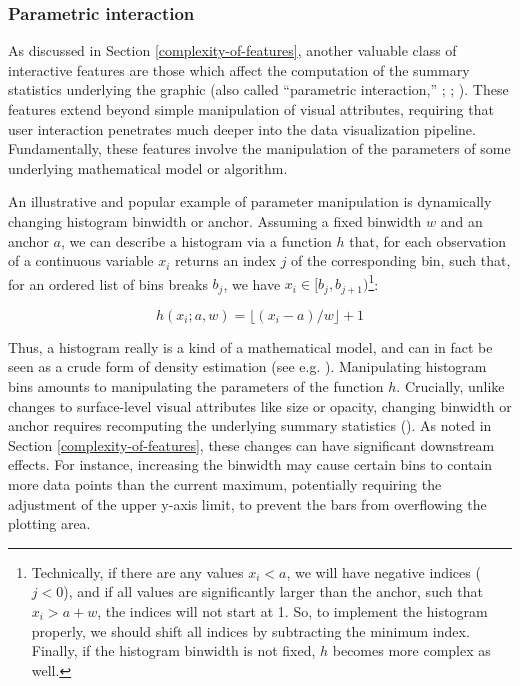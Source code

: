 \documentclass[
]{book}
\begin{document}
\subsubsection{Parametric interaction}\label{parametric-interaction}

As discussed in Section \ref{complexity-of-features}, another valuable class of interactive features are those which affect the computation of the summary statistics underlying the graphic (also called ``parametric interaction,'' ; ; ). These features extend beyond simple manipulation of visual attributes, requiring that user interaction penetrates much deeper into the data visualization pipeline. Fundamentally, these features involve the manipulation of the parameters of some underlying mathematical model or algorithm.

An illustrative and popular example of parameter manipulation is dynamically changing histogram binwidth or anchor. Assuming a fixed binwidth \(w\) and an anchor \(a\), we can describe a histogram via a function \(h\) that, for each observation of a continuous variable \(x_i\) returns an index \(j\) of the corresponding bin, such that, for an ordered list of bins breaks \(b_j\), we have \(x_i \in [b_{j}, b_{j + 1})\)\footnote{Technically, if there are any values \(x_i < a\), we will have negative indices (\(j < 0\)), and if all values are significantly larger than the anchor, such that \(x_i > a + w\), the indices will not start at 1. So, to implement the histogram properly, we should shift all indices by subtracting the minimum index. Finally, if the histogram binwidth is not fixed, \(h\) becomes more complex as well.}:

\[h(x_i; a, w) = \lfloor (x_i - a) / w \rfloor + 1\]

Thus, a histogram really is a kind of a mathematical model, and can in fact be seen as a crude form of density estimation (see e.g. ). Manipulating histogram bins amounts to manipulating the parameters of the function \(h\). Crucially, unlike changes to surface-level visual attributes like size or opacity, changing binwidth or anchor requires recomputing the underlying summary statistics (). As noted in Section \ref{complexity-of-features}, these changes can have significant downstream effects. For instance, increasing the binwidth may cause certain bins to contain more data points than the current maximum, potentially requiring the adjustment of the upper y-axis limit, to prevent the bars from overflowing the plotting area.
\end{document}
